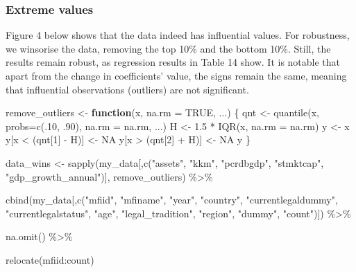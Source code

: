\documentclass[a4paper,nobind]{templates/ociamthesis}
\newenvironment{Shaded}{\begin{snugshade}}{\end{snugshade}}
\newcommand{\AttributeTok}[1]{\textcolor[rgb]{0.77,0.63,0.00}{#1}}
\newcommand{\ConstantTok}[1]{\textcolor[rgb]{0.00,0.00,0.00}{#1}}
\newcommand{\ControlFlowTok}[1]{\textcolor[rgb]{0.13,0.29,0.53}{\textbf{#1}}}
\newcommand{\DecValTok}[1]{\textcolor[rgb]{0.00,0.00,0.81}{#1}}
\newcommand{\FloatTok}[1]{\textcolor[rgb]{0.00,0.00,0.81}{#1}}
\newcommand{\FunctionTok}[1]{\textcolor[rgb]{0.00,0.00,0.00}{#1}}
\newcommand{\NormalTok}[1]{#1}
\newcommand{\OtherTok}[1]{\textcolor[rgb]{0.56,0.35,0.01}{#1}}
\newcommand{\SpecialCharTok}[1]{\textcolor[rgb]{0.00,0.00,0.00}{#1}}
\newcommand{\StringTok}[1]{\textcolor[rgb]{0.31,0.60,0.02}{#1}}
\renewenvironment{Shaded}
{
  \vspace{10pt}%
  \begin{snugshade}%
}{%
  \end{snugshade}%
  \vspace{8pt}%
}
\begin{document}
\hypertarget{extreme-values}{%
\subsubsection{Extreme values}\label{extreme-values}}

Figure 4 below shows that the data indeed has influential values. For robustness, we winsorise the data, removing the top 10\% and the bottom 10\%. Still, the results remain robust, as regression results in Table 14 show. It is notable that apart from the change in coefficients' value, the signs remain the same, meaning that influential observations (outliers) are not significant.

\begin{Shaded}
\begin{Highlighting}[]
\NormalTok{remove\_outliers }\OtherTok{\textless{}{-}} \ControlFlowTok{function}\NormalTok{(x, }\AttributeTok{na.rm =} \ConstantTok{TRUE}\NormalTok{, ...) \{}
\NormalTok{  qnt }\OtherTok{\textless{}{-}} \FunctionTok{quantile}\NormalTok{(x, }\AttributeTok{probs=}\FunctionTok{c}\NormalTok{(.}\DecValTok{10}\NormalTok{, .}\DecValTok{90}\NormalTok{), }\AttributeTok{na.rm =}\NormalTok{ na.rm, ...)}
\NormalTok{  H }\OtherTok{\textless{}{-}} \FloatTok{1.5} \SpecialCharTok{*} \FunctionTok{IQR}\NormalTok{(x, }\AttributeTok{na.rm =}\NormalTok{ na.rm)}
\NormalTok{  y }\OtherTok{\textless{}{-}}\NormalTok{ x}
\NormalTok{  y[x }\SpecialCharTok{\textless{}}\NormalTok{ (qnt[}\DecValTok{1}\NormalTok{] }\SpecialCharTok{{-}}\NormalTok{ H)] }\OtherTok{\textless{}{-}} \ConstantTok{NA}
\NormalTok{  y[x }\SpecialCharTok{\textgreater{}}\NormalTok{ (qnt[}\DecValTok{2}\NormalTok{] }\SpecialCharTok{+}\NormalTok{ H)] }\OtherTok{\textless{}{-}} \ConstantTok{NA}
\NormalTok{  y}
\NormalTok{\}}


\NormalTok{data\_wins }\OtherTok{\textless{}{-}} \FunctionTok{sapply}\NormalTok{(my\_data[,}\FunctionTok{c}\NormalTok{(}\StringTok{"assets"}\NormalTok{, }\StringTok{"kkm"}\NormalTok{, }\StringTok{"pcrdbgdp"}\NormalTok{, }\StringTok{"stmktcap"}\NormalTok{, }\StringTok{"gdp\_growth\_annual"}\NormalTok{)], remove\_outliers) }\SpecialCharTok{\%\textgreater{}\%} 
  
  \FunctionTok{cbind}\NormalTok{(my\_data[,}\FunctionTok{c}\NormalTok{(}\StringTok{"mfiid"}\NormalTok{, }\StringTok{"mfiname"}\NormalTok{, }\StringTok{"year"}\NormalTok{, }\StringTok{"country"}\NormalTok{, }\StringTok{"currentlegaldummy"}\NormalTok{, }
\StringTok{"currentlegalstatus"}\NormalTok{, }\StringTok{"age"}\NormalTok{, }\StringTok{"legal\_tradition"}\NormalTok{, }\StringTok{"region"}\NormalTok{, }\StringTok{"dummy"}\NormalTok{, }\StringTok{"count"}\NormalTok{)]) }\SpecialCharTok{\%\textgreater{}\%} 
  
  \FunctionTok{na.omit}\NormalTok{() }\SpecialCharTok{\%\textgreater{}\%} 
  
  \FunctionTok{relocate}\NormalTok{(mfiid}\SpecialCharTok{:}\NormalTok{count)}
\end{Highlighting}
\end{Shaded}
\end{document}
